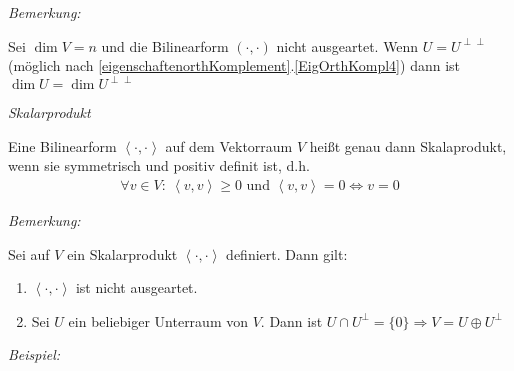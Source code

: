 \textit{Bemerkung:}

Sei $\dim V = n$ und die Bilinearform $(\cdot , \cdot)$ nicht ausgeartet.
Wenn $U = U^{\perp \perp}$ (möglich nach \ref{eigenschaftenorthKomplement}.\ref{EigOrthKompl4}) dann ist $\dim U = \dim U^{\perp\perp}$


\begin{mydef}\label{skalarprodukte} \textit{Skalarprodukt}

        Eine Bilinearform $\left\langle \cdot , \cdot \right\rangle$ auf dem Vektorraum $V$ heißt genau dann Skalaprodukt,
        wenn sie symmetrisch und positiv definit ist, d.h.
        \begin{align*}
                \forall v\in V : \ \left\langle v, v \right\rangle \geq 0 \text{ und } \left\langle v, v \right\rangle = 0 \Leftrightarrow v = 0
        \end{align*}
\end{mydef}

\textit{Bemerkung:}

Sei auf $V$ ein Skalarprodukt $\left\langle \cdot , \cdot \right\rangle$  definiert.
Dann gilt:
\begin{enumerate}
    \item $\left\langle \cdot ,  \cdot \right\rangle$ ist nicht ausgeartet.
    \item Sei $U$ ein beliebiger Unterraum von $V$. Dann ist $U \cap U^{\perp} = \{ 0 \} \Rightarrow V = U \oplus U^{\perp}$
\end{enumerate}


\textit{Beispiel:}

